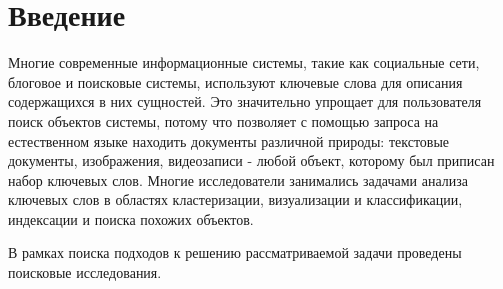 \chapter*{Введение}							%
\nocite{*}
Многие современные информационные системы, такие как социальные сети, блоговое и поисковые системы,  используют ключевые слова для описания содержащихся в них сущностей. Это значительно упрощает для пользователя поиск объектов системы, потому что позволяет с помощью запроса на естественном языке находить документы различной природы: текстовые документы, изображения, видеозаписи - любой объект, которому был приписан набор ключевых слов. Многие исследователи занимались задачами анализа ключевых слов в областях  кластеризации, визуализации и классификации,  индексации и поиска похожих объектов.


В рамках поиска подходов к решению рассматриваемой задачи проведены поисковые исследования. 


